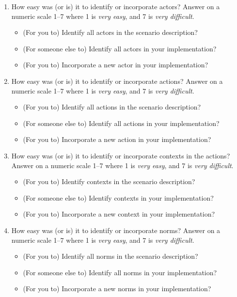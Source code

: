 \begin{enumerate}
\item How easy was (or is) it to identify or incorporate actors? 
Answer on a numeric scale 1--7 where 1 is \emph{very easy}, and 7 is \emph{very difficult}.
\begin{itemize}
\item (For you to) Identify all actors in the scenario description?	
\item (For someone else to) Identify all actors in your implementation?	
\item (For you to) Incorporate a new actor in your implementation?	
\end{itemize}

\item How easy was (or is) it to identify or incorporate actions? 
Answer on a numeric scale 1--7 where 1 is \emph{very easy}, and 7 is \emph{very difficult}.
\begin{itemize}
\item (For you to) Identify all actions in the scenario description?	
\item (For someone else to) Identify all actions in your implementation?	
\item (For you to) Incorporate a new action in your implementation?	
\end{itemize}

\item How easy was (or is) it to identify or incorporate contexts in the actions? 
Answer on a numeric scale 1--7 where 1 is \emph{very easy}, and 7 is \emph{very difficult}.
\begin{itemize}
\item (For you to) Identify contexts in the scenario description?	
\item (For someone else to) Identify contexts in your implementation?	
\item (For you to) Incorporate a new context in your implementation?	
\end{itemize}

\item How easy was (or is) it to identify or incorporate norms? 
Answer on a numeric scale 1--7 where 1 is \emph{very easy}, and 7 is \emph{very difficult}.
\begin{itemize}
\item (For you to) Identify all norms in the scenario description?	
\item (For someone else to) Identify all norms in your implementation?	
\item (For you to) Incorporate a new norms in your implementation?	
\end{itemize}


\end{enumerate}
